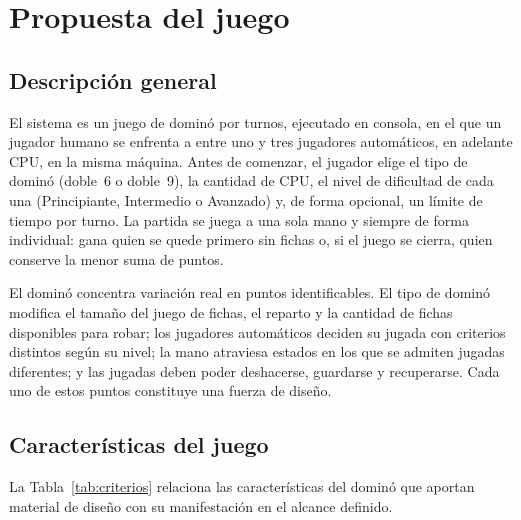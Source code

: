 \section{Propuesta del juego}\label{sec:propuesta}

\subsection{Descripción general}

El sistema es un juego de dominó por turnos, ejecutado en consola, en el que un jugador humano se enfrenta a entre uno y tres jugadores automáticos, en adelante CPU, en la misma máquina. Antes de comenzar, el jugador elige el tipo de dominó (doble~6 o doble~9), la cantidad de CPU, el nivel de dificultad de cada una (Principiante, Intermedio o Avanzado) y, de forma opcional, un límite de tiempo por turno. La partida se juega a una sola mano y siempre de forma individual: gana quien se quede primero sin fichas o, si el juego se cierra, quien conserve la menor suma de puntos.

El dominó concentra variación real en puntos identificables. El tipo de dominó modifica el tamaño del juego de fichas, el reparto y la cantidad de fichas disponibles para robar; los jugadores automáticos deciden su jugada con criterios distintos según su nivel; la mano atraviesa estados en los que se admiten jugadas diferentes; y las jugadas deben poder deshacerse, guardarse y recuperarse. Cada uno de estos puntos constituye una fuerza de diseño.

\subsection{Características del juego}

La Tabla~\ref{tab:criterios} relaciona las características del dominó que aportan material de diseño con su manifestación en el alcance definido.


